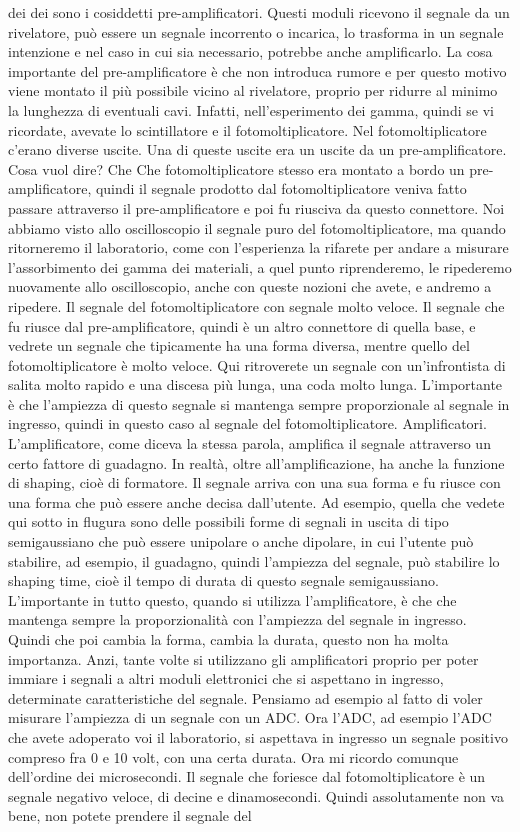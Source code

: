dei dei sono i cosiddetti pre-amplificatori. Questi moduli ricevono il segnale da un rivelatore, può essere un segnale incorrento o incarica, lo trasforma in un segnale intenzione e nel caso in cui sia necessario, potrebbe anche amplificarlo. La cosa importante del pre-amplificatore è che non introduca rumore e per questo motivo viene montato il più possibile vicino al rivelatore, proprio per ridurre al minimo la lunghezza di eventuali cavi. Infatti, nell'esperimento dei gamma, quindi se vi ricordate, avevate lo scintillatore e il fotomoltiplicatore. Nel fotomoltiplicatore c'erano diverse uscite. Una di queste uscite era un uscite da un pre-amplificatore. Cosa vuol dire? Che Che fotomoltiplicatore stesso era montato a bordo un pre-amplificatore, quindi il segnale prodotto dal fotomoltiplicatore veniva fatto passare attraverso il pre-amplificatore e poi fu riusciva da questo connettore. Noi abbiamo visto allo oscilloscopio il segnale puro del fotomoltiplicatore, ma quando ritorneremo il laboratorio, come con l'esperienza la rifarete per andare a misurare l'assorbimento dei gamma dei materiali, a quel punto riprenderemo, le ripederemo nuovamente allo oscilloscopio, anche con queste nozioni che avete, e andremo a ripedere. Il segnale del fotomoltiplicatore con segnale molto veloce. Il segnale che fu riusce dal pre-amplificatore, quindi è un altro connettore di quella base, e vedrete un segnale che tipicamente ha una forma diversa, mentre quello del fotomoltiplicatore è molto veloce. Qui ritroverete un segnale con un'infrontista di salita molto rapido e una discesa più lunga, una coda molto lunga. L'importante è che l'ampiezza di questo segnale si mantenga sempre proporzionale al segnale in ingresso, quindi in questo caso al segnale del fotomoltiplicatore. Amplificatori. L'amplificatore, come diceva la stessa parola, amplifica il segnale attraverso un certo fattore di guadagno. In realtà, oltre all'amplificazione, ha anche la funzione di shaping, cioè di formatore. Il segnale arriva con una sua forma e fu riusce con una forma che può essere anche decisa dall'utente. Ad esempio, quella che vedete qui sotto in flugura sono delle possibili forme di segnali in uscita di tipo semigaussiano che può essere unipolare o anche dipolare, in cui l'utente può stabilire, ad esempio, il guadagno, quindi l'ampiezza del segnale, può stabilire lo shaping time, cioè il tempo di durata di questo segnale semigaussiano. L'importante in tutto questo, quando si utilizza l'amplificatore, è che che mantenga sempre la proporzionalità con l'ampiezza del segnale in ingresso. Quindi che poi cambia la forma, cambia la durata, questo non ha molta importanza. Anzi, tante volte si utilizzano gli amplificatori proprio per poter immiare i segnali a altri moduli elettronici che si aspettano in ingresso, determinate caratteristiche del segnale. Pensiamo ad esempio al fatto di voler misurare l'ampiezza di un segnale con un ADC. Ora l'ADC, ad esempio l'ADC che avete adoperato voi il laboratorio, si aspettava in ingresso un segnale positivo compreso fra 0 e 10 volt, con una certa durata. Ora mi ricordo comunque dell'ordine dei microsecondi. Il segnale che foriesce dal fotomoltiplicatore è un segnale negativo veloce, di decine e dinamosecondi. Quindi assolutamente non va bene, non potete prendere il segnale del 